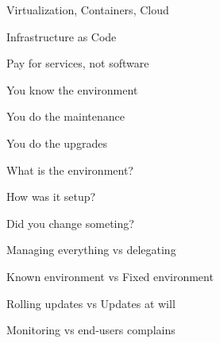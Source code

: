 \titleSlide


\inuitsSlide

\begin{iframe}[IT Nowadays (?)]
\item Virtualization, Containers, Cloud
\item Infrastructure as Code
\item Pay for services, not software
\end{iframe}
\begin{iframe}
\item You know the environment
\item You do the maintenance
\item You do the upgrades
\end{iframe}
\begin{iframe}
\item What is the environment?
\item How was it setup?
\item Did you change someting?
\end{iframe}
\begin{iframe}
\item Managing everything vs delegating
\item Known environment vs Fixed environment
\item Rolling updates vs Updates at will
\item Monitoring vs end-users complains
\end{iframe}


